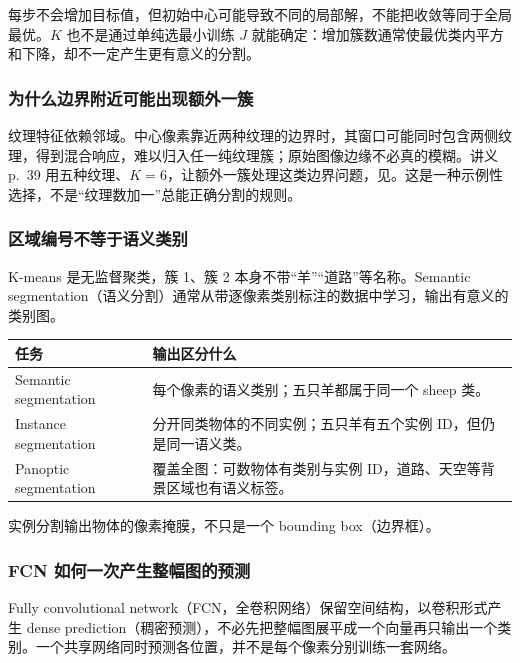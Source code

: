 每步不会增加目标值，但初始中心可能导致不同的局部解，不能把收敛等同于全局最优。$K$ 也不是通过单纯选最小训练 $J$ 就能确定：增加簇数通常使最优类内平方和下降，却不一定产生更有意义的分割。

\subsubsection*{为什么边界附近可能出现额外一簇}

纹理特征依赖邻域。中心像素靠近两种纹理的边界时，其窗口可能同时包含两侧纹理，得到混合响应，难以归入任一纯纹理簇；原始图像边缘不必真的模糊。讲义 p.~39 用五种纹理、$K=6$，让额外一簇处理这类边界问题，见。这是一种示例性选择，不是“纹理数加一”总能正确分割的规则。


\subsubsection*{区域编号不等于语义类别}

K-means 是无监督聚类，簇 1、簇 2 本身不带“羊”“道路”等名称。Semantic segmentation（语义分割）通常从带逐像素类别标注的数据中学习，输出有意义的类别图。

\begin{center}
\begin{tabularx}{\textwidth}{@{}>{\raggedright\arraybackslash}p{4.2cm}X@{}}
  \toprule
  任务 & 输出区分什么 \\
  \midrule
  Semantic segmentation & 每个像素的语义类别；五只羊都属于同一个 sheep 类。\\
  Instance segmentation & 分开同类物体的不同实例；五只羊有五个实例 ID，但仍是同一语义类。\\
  Panoptic segmentation & 覆盖全图：可数物体有类别与实例 ID，道路、天空等背景区域也有语义标签。\\
  \bottomrule
\end{tabularx}
\end{center}
实例分割输出物体的像素掩膜，不只是一个 bounding box（边界框）。

\subsubsection*{FCN 如何一次产生整幅图的预测}

Fully convolutional network（FCN，全卷积网络）保留空间结构，以卷积形式产生 dense prediction（稠密预测），不必先把整幅图展平成一个向量再只输出一个类别。一个共享网络同时预测各位置，并不是每个像素分别训练一套网络。

